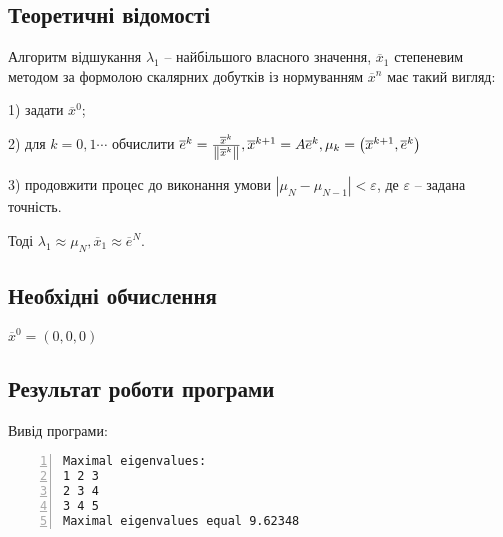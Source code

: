 \documentclass[a4paper, 12pt]{article}
\begin{document}
\subsection{Теоретичні відомості}

Алгоритм відшукання $\lambda_1$ -- найбільшого власного значення, $\overline{x}_1$ степеневим методом за формолою скалярних добутків із нормуванням $\overline{x}^n$ має такий вигляд:

1) задати $\overline{x}^0$;

2) для $k = 0, 1 \cdots$ обчислити $\overline{e}^k = \frac{\overline{x}^k}{\norm{\overline{x}^k}}, \overline{x}^{k+1} = A \overline{e}^k, \\ \mu_k = \left( \overline{x}^{k+1}, \overline{e}^k \right)$

3) продовжити процес до виконання умови $|\mu_{N} - \mu_{N-1}| < \varepsilon$, де $\varepsilon$ -- задана точність.

Тоді $\lambda_1 \approx \mu_N, \overline{x}_1 \approx \overline{e}^N$.

\subsection{Необхідні обчислення}

$\overline{x}^0 = (0, 0, 0)$

\subsection{Результат роботи програми}

Вивід програми:

\begin{Verbatim}[numbers=left,xleftmargin=20mm]
Maximal eigenvalues:
1 2 3 
2 3 4 
3 4 5 
Maximal eigenvalues equal 9.62348
\end{Verbatim}
\end{document}
